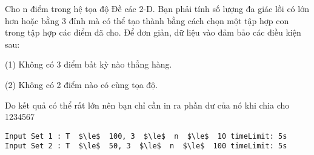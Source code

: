 Cho n điểm trong hệ tọa độ Đề các 2-D. Bạn phải tính số lượng đa giác lồi có lớn hơn hoặc bằng 3 đỉnh mà có thể tạo thành bằng cách chọn một tập hợp con trong tập hợp các điểm đã cho. Để đơn giản, dữ liệu vào đảm bảo các điều kiện sau:  
\begin{itemize}

    (1) Không có 3 điểm bất kỳ nào thẳng hàng.   

    (2) Không có 2 điểm nào có cùng tọa độ.   
\end{itemize}

   Do kết quả có thể rất lớn nên bạn chỉ cần in ra phần dư của nó khi chia cho 1234567  

\begin{verbatim}
Input Set 1 : T  $\le$  100, 3  $\le$  n  $\le$  10 timeLimit: 5s  
Input Set 2 : T  $\le$  50, 3  $\le$  n  $\le$  100 timeLimit: 5s 
\end{verbatim}